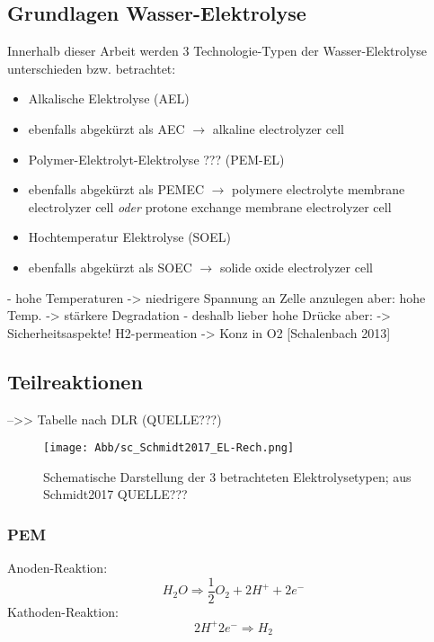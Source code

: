 \documentclass[onecolumn,10pt,titlepage]{article}
\begin{document}
\subsection{Grundlagen Wasser-Elektrolyse}
\label{subs_Grundl_EL}
Innerhalb dieser Arbeit werden 3 Technologie-Typen der Wasser-Elektrolyse unterschieden bzw. betrachtet:
\begin{itemize}
	\item Alkalische Elektrolyse (AEL)
	\item[]ebenfalls abgekürzt als \glqq AEC \grqq $\rightarrow$ alkaline electrolyzer cell
	\item Polymer-Elektrolyt-Elektrolyse ??? (PEM-EL)
	\item[]ebenfalls abgekürzt als \glqq PEMEC \grqq $\rightarrow$ polymere electrolyte membrane electrolyzer cell \textit{oder} protone exchange membrane electrolyzer cell
	\item Hochtemperatur Elektrolyse (SOEL)
	\item[]ebenfalls abgekürzt als \glqq SOEC \grqq $\rightarrow$ solide oxide electrolyzer cell
	
\end{itemize}





- hohe Temperaturen -> niedrigere Spannung an Zelle anzulegen
aber: hohe Temp. -> stärkere Degradation
- deshalb lieber hohe Drücke aber: -> Sicherheitsaspekte! H2-permeation -> Konz in O2
[Schalenbach 2013]


\subsection{Teilreaktionen}
-->> Tabelle nach DLR (QUELLE???)
\begin{figure}
	\label{EL-Teilreakt}
	\texttt{[image: Abb/sc\_Schmidt2017\_EL-Rech.png]}
	\caption{Schematische Darstellung der 3 betrachteten Elektrolysetypen; aus Schmidt2017 QUELLE???}
\end{figure}

\subsubsection{PEM}
Anoden-Reaktion:
\begin{equation}\label{Teilreakt_Anode_PEM}
H_2O \Rightarrow \frac{1}{2} O_2 + 2H^+ +2e^-
\end{equation}
Kathoden-Reaktion:
\begin{equation}\label{Teilreakt-Kathode_PEM}
2H^+ 2e^- \Rightarrow H_2
\end{equation}
\end{document}
